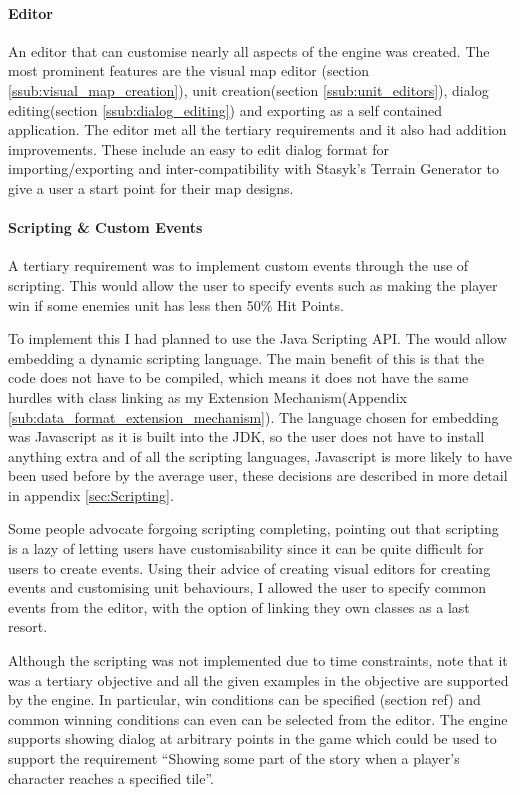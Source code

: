 \paragraph{Editor\\}
An editor that can customise nearly all aspects of the engine was created.  The most prominent features are the visual map editor (section \ref{ssub:visual_map_creation}), unit creation(section \ref{ssub:unit_editors}), dialog editing(section \ref{ssub:dialog_editing}) and exporting as a self contained application.  The editor met all the  tertiary requirements and it also had addition improvements. These include an easy to edit dialog format for importing/exporting and inter-compatibility  with Stasyk’s Terrain Generator to give a user a start point for their map designs.


\paragraph{Scripting \& Custom Events\\}
A tertiary requirement was to implement custom events through the use of scripting.  This would allow the user to specify events such as making the player win if some enemies unit has less then 50\% Hit Points. 

To implement this I had planned to use the Java Scripting API\cite{javas}. The would allow embedding a dynamic scripting language.  The main benefit of this is that the code does not have to be compiled, which means it does not have the same hurdles with class linking as my Extension Mechanism(Appendix \ref{sub:data_format_extension_mechanism}).   The language chosen for embedding was Javascript  as it is built into the JDK, so the user does not have to install anything extra and of all the scripting languages, Javascript  is more likely to have been used before by the average user, these decisions are described in more detail in appendix \ref{sec:Scripting}. 

Some people \cite[Section 10.6]{Rabin:2002:AGP:515547} advocate forgoing scripting completing, pointing out that scripting is a lazy of letting users have customisability since it can be quite difficult for users to create events.  Using their advice of creating visual editors for creating events and customising unit behaviours, I allowed the user to specify common events from the editor, with the option of linking they own classes as a last resort. 

Although the scripting was not implemented due to time constraints, note that it was a tertiary objective and all the given examples in the objective are supported by the engine. In particular, win conditions can be specified (section ref) and common winning conditions can even can be selected from the editor.  The engine supports showing dialog at arbitrary points in the game which could be used to support the requirement ``Showing some part of the story when a player’s character reaches a specified tile''.

